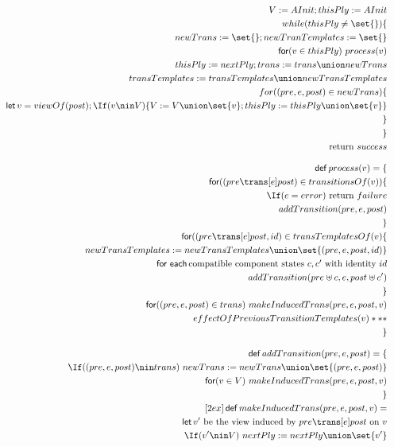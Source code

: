 \begin{figure}
\[
\begin{align}
V := AInit; thisPly := AInit \\
while(thisPly \ne \set{})\{ \\
\quad newTrans := \set{}; newTranTemplates := \set{} \\
\quad \For(v \in thisPly)\ process(v) \\
\quad  thisPly := nextPly; trans := trans \union newTrans \\
\quad  transTemplates := transTemplates \union newTransTemplates \\
\quad for((pre,e,post) \in newTrans)\{ \\
\qquad \Let v = viewOf(post); 
  \If(v \nin V)\{ V := V \union \set{v}; thisPly := thisPly \union \set{v} \}\\
\quad \}\\
\} \\
\mbox{return $success$}
\\[2ex]
\Def process(v) = \{ \\ %
\quad \For ((pre \trans[e] post) \in transitionsOf(v)) \{ \\
\qquad  \If (e = error)\ \mbox{return $failure$} \\
\qquad  addTransition(pre, e, post) \\
\quad \} \\
\quad \For ((pre \trans[e] post, id) \in transTemplatesOf(v) \{ \\
\qquad  newTransTemplates := newTransTemplates \union \set{(pre,e,post,id)} \\
\qquad \Foreach \mbox{compatible component states~$c, c'$ with identity~$id$} \\
\qquad\quad           addTransition(pre \uplus c, e, post \uplus c') \\
\quad \} \\
\quad \For ((pre,e,post) \in trans)\ makeInducedTrans(pre,e,post,v) \\
\quad effectOfPreviousTransitionTemplates(v) *** \\
\} %
\\[2ex]
\Def addTransition(pre, e, post) = \{ \\
\quad \If ((pre,e,post) \nin trans)\ 
        newTrans := newTrans \union \set{(pre,e,post)} \\
\quad \For (v \in V)\ makeInducedTrans(pre,e,post,v) \\
\} 
\\ [2ex]
\Def makeInducedTrans(pre,e,post,v) = \\
\quad \Let v' \mbox{ be the view induced by $pre \trans[e] post$ on $v$} \\
\quad \If (v' \nin V)\ nextPly := nextPly \union \set{v'} 
\end{align}
\]
\end{figure}
